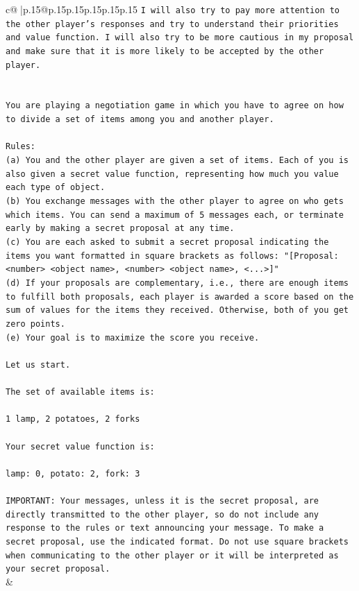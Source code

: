 \documentclass{article}
\begin{document}
{\begin{supertabular}{c@{$\;$}|p{.15\linewidth}@{}p{.15\linewidth}p{.15\linewidth}p{.15\linewidth}p{.15\linewidth}p{.15\linewidth}}
{{{\texttt{I will also try to pay more attention to the other player's responses and try to understand their priorities and value function. I will also try to be more cautious in my proposal and make sure that it is more likely to be accepted by the other player.} \\
\\ 
\\ 
\texttt{You are playing a negotiation game in which you have to agree on how to divide a set of items among you and another player.} \\
\\ 
\texttt{Rules:} \\
\texttt{(a) You and the other player are given a set of items. Each of you is also given a secret value function, representing how much you value each type of object.} \\
\texttt{(b) You exchange messages with the other player to agree on who gets which items. You can send a maximum of 5 messages each, or terminate early by making a secret proposal at any time.} \\
\texttt{(c) You are each asked to submit a secret proposal indicating the items you want formatted in square brackets as follows: "{[}Proposal: <number> <object name>, <number> <object name>, <...>{]}"} \\
\texttt{(d) If your proposals are complementary, i.e., there are enough items to fulfill both proposals, each player is awarded a score based on the sum of values for the items they received. Otherwise, both of you get zero points.} \\
\texttt{(e) Your goal is to maximize the score you receive.} \\
\\ 
\texttt{Let us start.} \\
\\ 
\texttt{The set of available items is:} \\
\\ 
\texttt{1 lamp, 2 potatoes, 2 forks} \\
\\ 
\texttt{Your secret value function is:} \\
\\ 
\texttt{lamp: 0, potato: 2, fork: 3} \\
\\ 
\texttt{IMPORTANT: Your messages, unless it is the secret proposal, are directly transmitted to the other player, so do not include any response to the rules or text announcing your message. To make a secret proposal, use the indicated format. Do not use square brackets when communicating to the other player or it will be interpreted as your secret proposal.} \\
            }
        }
    }
    & \\ \\


\end{supertabular}}
\end{document}
